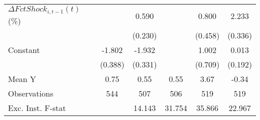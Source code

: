 {\begin{tabular}{l*{5}{c}}
\addlinespace
$ \Delta FctShock_{i,t-1}(t)$ (\%)&                     &       0.590\sym{**} &                     &       0.800\sym{*}  &       2.233\sym{***}\\
                    &                     &     (0.230)         &                     &     (0.458)         &     (0.336)         \\
\addlinespace
Constant            &      -1.802\sym{***}&      -1.932\sym{***}&                     &       1.002         &       0.013         \\
                    &     (0.388)         &     (0.331)         &                     &     (0.709)         &     (0.192)         \\
\midrule
Mean Y              &        0.75         &        0.55         &        0.55         &        3.67         &       -0.34         \\
Observations        &         544         &         507         &         506         &         519         &         519         \\
Exc. Inst. F-stat   &                     &      14.143         &      31.754         &      35.866         &      22.967         \\
\bottomrule
\end{tabular}
}
